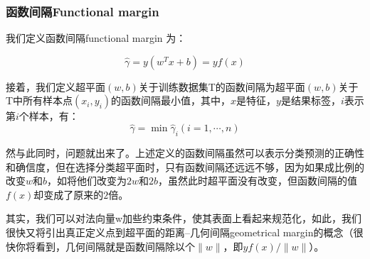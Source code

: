 \documentclass[a4paper,12pt]{article}
\begin{document}
\subsubsection{函数间隔Functional margin}
我们定义函数间隔functional margin 为： 

\begin{equation}
\widehat{\gamma}=y(w^Tx+b)=yf(x)
\end{equation}

接着，我们定义超平面$(w,b)$关于训练数据集T的函数间隔为超平面$(w,b)$关于T中所有样本点$(x_i,y_i)$的函数间隔最小值，其中，$x$是特征，$y$是结果标签，$i$表示第$i$个样本，有：
\begin{equation}
\widehat{\gamma}=\min\widehat{\gamma}_i(i=1,\cdots,n)
\end{equation}

然与此同时，问题就出来了。上述定义的函数间隔虽然可以表示分类预测的正确性和确信度，但在选择分类超平面时，只有函数间隔还远远不够，因为如果成比例的改变$w$和$b$，如将他们改变为$2w$和$2b$，虽然此时超平面没有改变，但函数间隔的值$f(x)$却变成了原来的$2$倍。

其实，我们可以对法向量w加些约束条件，使其表面上看起来规范化，如此，我们很快又将引出真正定义点到超平面的距离--几何间隔geometrical margin的概念（很快你将看到，几何间隔就是函数间隔除以个$\|w\|$，即$yf(x) / \|w\|$）。
\end{document}

